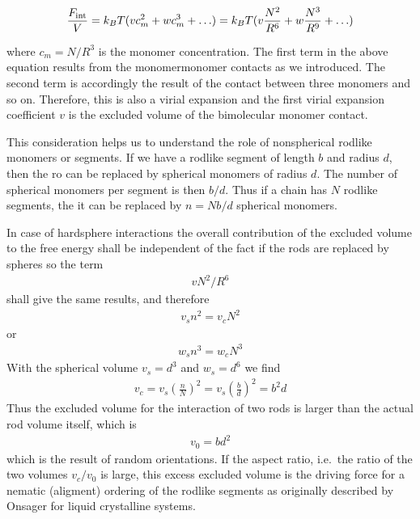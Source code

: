 \documentclass[letterpaper,10pt,english]{sphinxmanual}
\begin{document}
\sphinxAtStartPar
\begin{equation}
\frac{F_{\rm int}}{V}=k_B T(vc_m^2 + w c_m^3+\ldots)=k_B T (v\frac{N^2}{R^6}+w\frac{N^3}{R^9}+\ldots)
\end{equation}

\sphinxAtStartPar
where \(c_m=N/R^3\) is the monomer concentration. The first term in the above equation results from the monomer\sphinxhyphen{}monomer contacts as we introduced. The second term is accordingly the result of the contact between three monomers and so on. Therefore, this is also a virial expansion and the first virial expansion coefficient \(v\) is the excluded volume of the bimolecular monomer contact.

\sphinxAtStartPar
This consideration helps us to understand the role of non\sphinxhyphen{}spherical rodlike monomers or segments. If we have a rodlike segment of length \(b\) and radius \(d\), then the ro can be replaced by spherical monomers of radius \(d\). The number of spherical monomers per segment is then \(b/d\). Thus if a chain has \(N\) rodlike segments, the it can be replaced by \(n=Nb/d\) spherical monomers.

\sphinxAtStartPar
In case of hard\sphinxhyphen{}sphere interactions the overall contribution of the excluded volume to the free energy shall be independent of the fact if the rods are replaced by spheres so the term
\begin{equation*}
\begin{split}vN^2/R^6\end{split}
\end{equation*}
\sphinxAtStartPar
shall give the same results, and therefore
\begin{equation*}
\begin{split}v_s n^2 = v_c N^2\end{split}
\end{equation*}
\sphinxAtStartPar
or
\begin{equation*}
\begin{split}w_sn^3=w_c N^3\end{split}
\end{equation*}
\sphinxAtStartPar
With the spherical volume \(v_s=d^3\) and \(w_s=d^6\) we find
\begin{equation*}
\begin{split}v_c=v_s\left (\frac{n}{N}\right )^2=v_s\left(\frac{b}{d} \right )^2=b^2 d\end{split}
\end{equation*}
\sphinxAtStartPar
Thus the excluded volume for the interaction of two rods is larger than the actual rod volume itself, which is
\begin{equation*}
\begin{split}v_0=bd^2\end{split}
\end{equation*}
\sphinxAtStartPar
which is the result of random orientations. If the aspect ratio, i.e. the ratio of the two volumes \(v_c/v_0\) is large, this excess excluded volume is the driving force for a nematic (aligment) ordering of the rodlike segments as originally described by Onsager for liquid crystalline systems.
\end{document}
